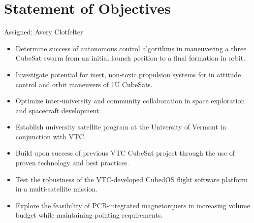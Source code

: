 \section{Statement of Objectives}
Assigned: Avery Clotfelter

\begin{itemize}
  \item Determine success of autonomous control algorithms in
    maneuvering a three CubeSat swarm from an initial launch position to a
    final formation in orbit.
  \item Investigate potential for inert, non-toxic propulsion systems
    for in attitude control and orbit maneuvers of 1U CubeSats.
  \item Optimize inter-university and community collaboration in space
    exploration and spacecraft development.
  \item Establish university satellite program at the University of
    Vermont in conjunction with VTC.
  \item Build upon success of previous VTC CubeSat project through the use of proven technology and best practices.
  \item Test the robustness of the VTC-developed CubedOS flight software platform in a multi-satellite mission.
  \item Explore the feasibility of PCB-integrated magnetorquers in
    increasing volume budget while maintaining pointing requirements.

\end{itemize}
